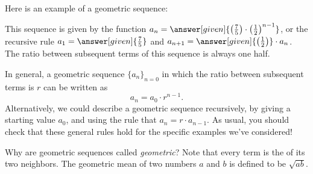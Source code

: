 \documentclass{ximera}
\begin{document}
\begin{example}
  Here is an example of a geometric sequence:
  \begin{image}
  \end{image}
  This sequence is given by the function $a_n=\answer[given]{\left(\frac{7}{5}\right)\cdot
    \left(\frac{1}{2}\right)^{n-1}}$, or the recursive rule $a_1 = \answer[given]{\frac{7}{5}}$ and
  $a_{n+1} = \answer[given]{\left(\frac{1}{2}\right)}\cdot a_n$. The ratio between subsequent terms 
  of this sequence is always one half.
\end{example}

In general, a geometric sequence $\{a_n\}_{n=0}$ in which the ratio between
subsequent terms is $r$ can be written as
\[
a_n = a_0 \cdot r^{n-1}.
\]
Alternatively, we could describe a geometric sequence
recursively, by giving a starting value $a_0$, and using the rule that
$a_{n} = r \cdot a_{n-1}$.  As usual, you should check that these general 
rules hold for the specific examples we've considered!

\begin{remark}
Why are geometric sequences called \textit{geometric}?  Note that
every term is the  of its two neighbors.  The
geometric mean of two numbers $a$ and $b$ is defined to be
$\sqrt{ab}$.

\end{remark}
%
\end{document}
